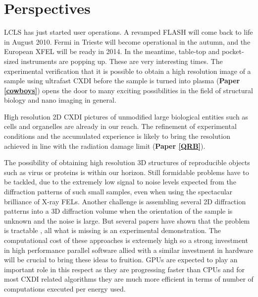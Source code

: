 \chapter{Perspectives}\label{Future Perspectives}\noindent

LCLS has just started user operations. A revamped FLASH will come back to life
in August 2010. Fermi in Trieste will become operational in the autumn, and the
European XFEL will be ready in 2014. In the meantime, table-top and pocket-sized
instruments are popping up. These are very interesting times. The experimental
verification that it is possible to obtain a high resolution image of a sample
using ultrafast CXDI before the sample is turned into plasma ({\bf Paper
  \ref{cowboys}}) opens the door to many exciting possibilities in the field of
structural biology and nano imaging in general.

High resolution 2D CXDI pictures of unmodified large biological entities such as cells
and organelles are already in our reach. The refinement of experimental
conditions and the accumulated experience is likely to bring the resolution
achieved in line with the radiation damage limit ({\bf Paper
  \ref{QRB}}).

The possibility of obtaining high resolution 3D structures of reproducible
objects such as virus or proteins is within our horizon. Still formidable
problems have to be tackled, due to the extremely low signal to noise levels
expected from the diffraction patterns of such small samples, even when using
the spectacular brilliance of X-ray FELs. Another challenge is assembling
several 2D diffraction patterns into a 3D diffraction volume when the
orientation of the sample is unknown and the noise is large. But several papers
have shown that the problem is tractable
\cite{Elser2009Noise,NeTeDuaneLoh2009Reconstruction,Fung2008Structure}, all 
what is missing is an experimental demonstration. The computational cost of
these approaches is extremely high so a strong investment in high
performance parallel software allied with a similar investment in hardware will
be crucial to bring these ideas to fruition. GPUs are expected to play an
important role in this respect as they are progressing faster than CPUs and for
most CXDI related algorithms they are much more efficient in terms of number of 
computations executed per energy used.

